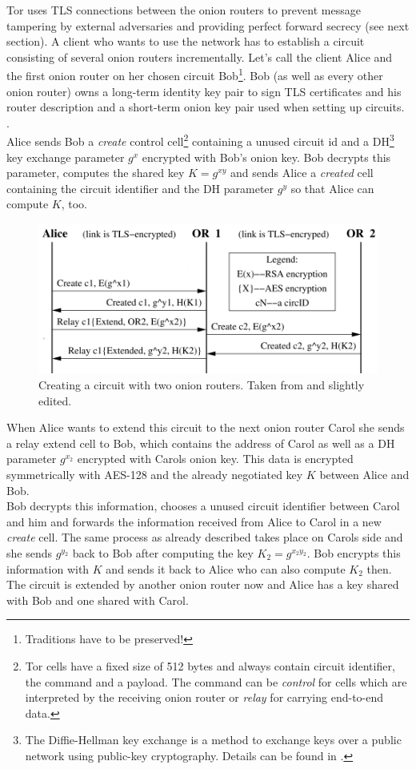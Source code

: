 Tor uses TLS connections between the onion routers to prevent message tampering by external adversaries and providing perfect forward secrecy (see next section). A client who wants to use the network has to establish a circuit consisting of several onion routers incrementally. Let's call the client Alice and the first onion router on her chosen circuit Bob\footnote{
	Traditions have to be preserved!
}. Bob (as well as every other onion router) owns a long-term identity key pair to sign TLS certificates and his router description and a short-term onion key pair used when setting up circuits. .\\ Alice sends Bob a \textit{create} control cell\footnote{
	Tor cells have a fixed size of 512 bytes and always contain circuit identifier, the command and a payload. The command can be \textit{control} for cells which are interpreted by the receiving onion router or \textit{relay} for carrying end-to-end data.
} containing a unused circuit id and a DH\footnote{
	The Diffie-Hellman key exchange is a method to exchange keys over a public network using public-key cryptography. Details can be found in \cite{diffie1976new}.
} key exchange parameter \(g^x\) encrypted with Bob's onion key. Bob decrypts this parameter, computes the shared key \(K = g^{xy}\) and sends Alice a \textit{created} cell containing the circuit identifier and the DH parameter \(g^y\) so that Alice can compute \(K\), too.

\begin{figure}
	\includegraphics[width=\columnwidth]{img/circuit_creation.png}
	\caption{Creating a circuit with two onion routers. Taken from \cite{tor2004original} and slightly edited.}
	\label{img_circuit_creation}
\end{figure}

When Alice wants to extend this circuit to the next onion router Carol she sends a relay extend cell to Bob, which contains the address of Carol as well as a DH parameter \(g^{x_2}\) encrypted with Carols onion key. This data is encrypted symmetrically with AES-128 and the already negotiated key \(K\) between Alice and Bob.\\
Bob decrypts this information, chooses a unused circuit identifier between Carol and him and forwards the information received from Alice to Carol in a new \textit{create} cell. The same process as already described takes place on Carols side and she sends \(g^{y_2}\) back to Bob after computing the key \(K_2 = g^{x_2y_2}\). Bob encrypts this information with \(K\) and sends it back to Alice who can also compute \(K_2\) then. The circuit is extended by another onion router now and Alice has a key shared with Bob and one shared with Carol.

